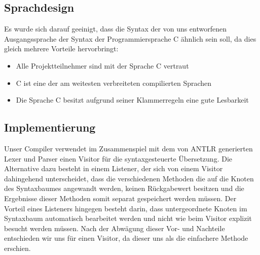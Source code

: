 \subsection{Sprachdesign}
Es wurde sich darauf geeinigt, dass die Syntax der von uns entworfenen Ausgangssprache der Syntax der Programmiersprache C ähnlich sein soll, da dies gleich mehrere Vorteile hervorbringt:
\begin{itemize}
\item Alle Projektteilnehmer sind mit der Sprache C vertraut
\item C ist eine der am weitesten verbreiteten compilierten Sprachen
\item Die Sprache C besitzt aufgrund seiner Klammerregeln eine gute Lesbarkeit
\end{itemize}

\subsection{Implementierung}
Unser Compiler verwendet im Zusammenspiel mit dem von ANTLR generierten Lexer und Parser einen Visitor für die syntaxgesteuerte Übersetzung. Die Alternative dazu besteht in einem Listener, der sich von einem Visitor dahingehend unterscheidet, dass die verschiedenen Methoden die auf die Knoten des Syntaxbaumes angewandt werden, keinen Rückgabewert besitzen und die Ergebnisse dieser Methoden somit separat gespeichert werden müssen. Der Vorteil eines Listeners hingegen besteht darin, dass untergeordnete Knoten im Syntaxbaum automatisch bearbeitet werden und nicht wie beim Visitor explizit besucht werden müssen. Nach der Abwägung dieser Vor- und Nachteile entschieden wir uns für einen Visitor, da dieser uns als die einfachere Methode erschien.



